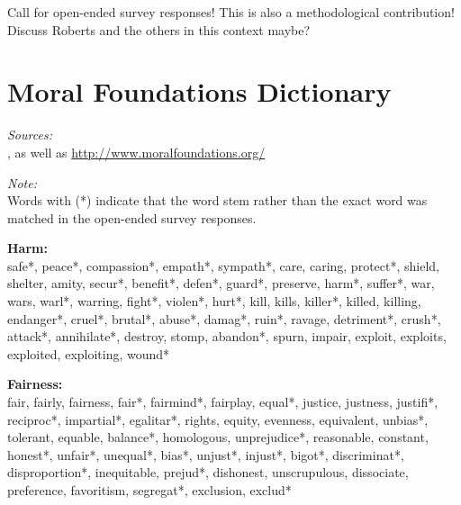\documentclass[12pt]{article}
\begin{document}
Call for open-ended survey responses! This is also a methodological contribution! Discuss Roberts and the others in this context maybe?



\clearpage\flushleft\footnotesize\singlespacing
\appendices
\section{Moral Foundations Dictionary}
\renewcommand\thefigure{\thesection.\arabic{figure}}
\renewcommand\thetable{\thesection.\arabic{table}}
\setcounter{figure}{0}
\setcounter{table}{0}

\textit{Sources:}\\
\citet{graham2009liberals}, as well as \url{http://www.moralfoundations.org/}
\vspace{.5cm}

\textit{Note:}\\
Words with (*) indicate that the word stem rather than the exact word was matched in the open-ended survey responses.
\vspace{.5cm}

\textbf{Harm:}\\
safe*, peace*, compassion*, empath*, sympath*, care, caring, protect*, shield, shelter, amity, secur*, benefit*, defen*, guard*, preserve, harm*, suffer*, war, wars, warl*, warring, fight*, violen*, hurt*, kill, kills, killer*, killed, killing, endanger*, cruel*, brutal*, abuse*, damag*, ruin*, ravage, detriment*, crush*, attack*, annihilate*, destroy, stomp, abandon*, spurn, impair, exploit, exploits, exploited, exploiting, wound*
\vspace{.5cm}

\textbf{Fairness:}\\
fair, fairly, fairness, fair*, fairmind*, fairplay, equal*, justice, justness, justifi*, reciproc*, impartial*, egalitar*, rights, equity, evenness, equivalent, unbias*, tolerant, equable, balance*, homologous, unprejudice*, reasonable, constant, honest*, unfair*, unequal*, bias*, unjust*, injust*, bigot*, discriminat*, disproportion*, inequitable, prejud*, dishonest, unscrupulous, dissociate, preference, favoritism, segregat*, exclusion, exclud*
\vspace{.5cm}
\end{document}
